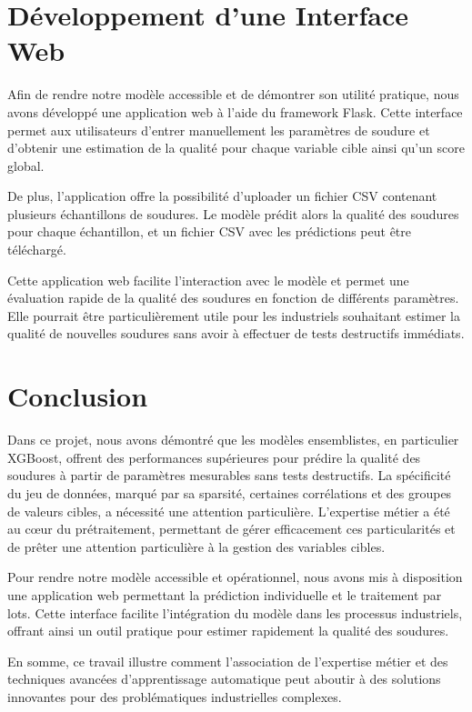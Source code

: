 \documentclass{article}
\begin{document}
\section{Développement d'une Interface Web}

Afin de rendre notre modèle accessible et de démontrer son utilité pratique, nous avons développé une application web à l'aide du framework Flask. Cette interface permet aux utilisateurs d'entrer manuellement les paramètres de soudure et d'obtenir une estimation de la qualité pour chaque variable cible ainsi qu'un score global.

De plus, l'application offre la possibilité d'uploader un fichier CSV contenant plusieurs échantillons de soudures. Le modèle prédit alors la qualité des soudures pour chaque échantillon, et un fichier CSV avec les prédictions peut être téléchargé.

Cette application web facilite l'interaction avec le modèle et permet une évaluation rapide de la qualité des soudures en fonction de différents paramètres. Elle pourrait être particulièrement utile pour les industriels souhaitant estimer la qualité de nouvelles soudures sans avoir à effectuer de tests destructifs immédiats.

\section{Conclusion}

Dans ce projet, nous avons démontré que les modèles ensemblistes, en particulier XGBoost, offrent des performances supérieures pour prédire la qualité des soudures à partir de paramètres mesurables sans tests destructifs. La spécificité du jeu de données, marqué par sa sparsité, certaines corrélations et des groupes de valeurs cibles, a nécessité une attention particulière. L’expertise métier a été au cœur du prétraitement, permettant de gérer efficacement ces particularités et de prêter une attention particulière à la gestion des variables cibles.

Pour rendre notre modèle accessible et opérationnel, nous avons mis à disposition une application web permettant la prédiction individuelle et le traitement par lots. Cette interface facilite l’intégration du modèle dans les processus industriels, offrant ainsi un outil pratique pour estimer rapidement la qualité des soudures.

En somme, ce travail illustre comment l’association de l’expertise métier et des techniques avancées d’apprentissage automatique peut aboutir à des solutions innovantes pour des problématiques industrielles complexes.
\end{document}
